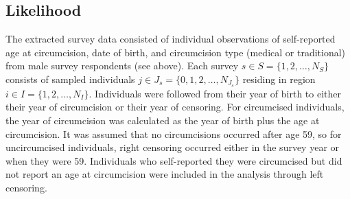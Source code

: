 \documentclass{article}
\begin{document}
\begin{appendix}

\subsection{Likelihood}
\label{sec::likelihood}


The extracted survey data consisted of individual observations of self-reported age at circumcision, date of birth, and circumcision type (medical or traditional) from male survey respondents (see above). Each survey $s \in S = \{1, 2, \ldots, N_S\}$ consists of sampled individuals $j \in J_s = \{0, 1, 2, \ldots, N_{J_s}\}$ residing in region $i \in I = \{1, 2, \ldots, N_I\}$. Individuals were followed from their year of birth to either their year of circumcision or their year of censoring. For circumcised individuals, the year of circumcision was calculated as the year of birth plus the age at circumcision. It was assumed that no circumcisions occurred after age 59, so for uncircumcised individuals, right censoring occurred either in the survey year or when they were 59. Individuals who self-reported they were circumcised but did not report an age at circumcision were included in the analysis through left censoring. 


\end{appendix}
\end{document}
